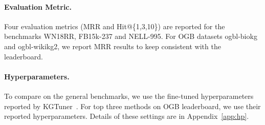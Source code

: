 \documentclass[11pt,a4paper]{article}
\begin{document}
  
  \paragraph{Evaluation Metric.}
  Four  evaluation metrics (MRR and Hit@\{1,3,10\}) are reported
  for the benchmarks WN18RR, FB15k-237 and NELL-995.
For OGB datasets ogbl-biokg and ogbl-wikikg2,
  we report MRR results to keep consistent with the leaderboard.
  
  
  \paragraph{Hyperparameters.}
  To compare on the general benchmarks, 
  we use the fine-tuned hyperparameters reported by KGTuner~\cite{zhang2022kgtuner}.
  For top three methods on OGB leaderboard, 
  we use their reported hyperparameters.
  Details of these settings are in Appendix~\ref{app:hp}.
  
\end{document}
